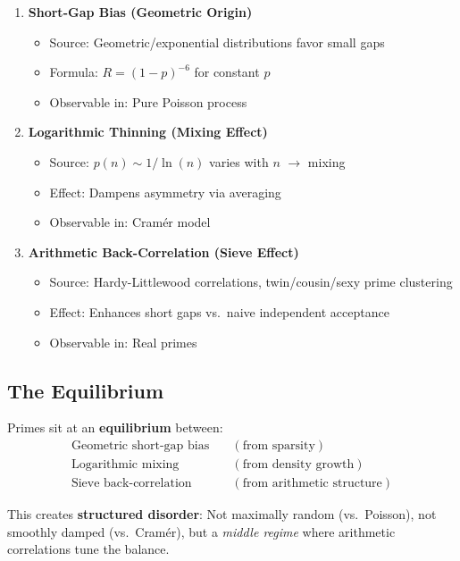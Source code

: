 \documentclass[11pt,a4paper]{article}
\theoremstyle{definition}
\theoremstyle{remark}
\begin{document}
\begin{enumerate}
\item \textbf{Short-Gap Bias (Geometric Origin)}
\begin{itemize}
\item Source: Geometric/exponential distributions favor small gaps
\item Formula: $R = (1-p)^{-6}$ for constant $p$
\item Observable in: Pure Poisson process
\end{itemize}

\item \textbf{Logarithmic Thinning (Mixing Effect)}
\begin{itemize}
\item Source: $p(n) \sim 1/\ln(n)$ varies with $n$ $\to$ mixing
\item Effect: Dampens asymmetry via averaging
\item Observable in: Cramér model
\end{itemize}

\item \textbf{Arithmetic Back-Correlation (Sieve Effect)}
\begin{itemize}
\item Source: Hardy-Littlewood correlations, twin/cousin/sexy prime clustering
\item Effect: Enhances short gaps vs.~naive independent acceptance
\item Observable in: Real primes
\end{itemize}
\end{enumerate}

\subsection{The Equilibrium}

Primes sit at an \textbf{equilibrium} between:
\begin{align*}
\text{Geometric short-gap bias} &\quad (\text{from sparsity}) \\
\text{Logarithmic mixing} &\quad (\text{from density growth}) \\
\text{Sieve back-correlation} &\quad (\text{from arithmetic structure})
\end{align*}

This creates \textbf{structured disorder}: Not maximally random (vs.~Poisson), not smoothly damped (vs.~Cramér), but a \emph{middle regime} where arithmetic correlations tune the balance.
\end{document}
